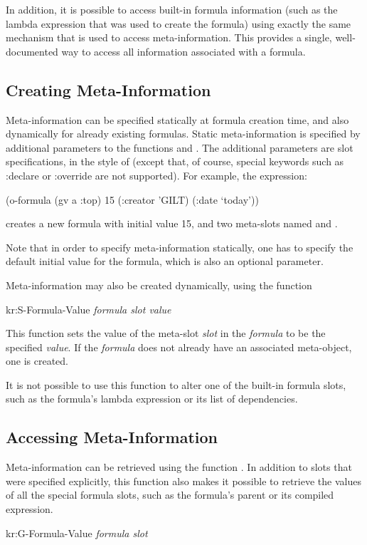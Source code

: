 In addition, it is possible to access built-in formula information
(such as the lambda expression that was used to create the formula)
using exactly the same mechanism that is used to access
meta-information.  This provides a single, well-documented way to
access all information associated with a formula.

\subsection{Creating Meta-Information}

Meta-information can be specified statically at formula creation time,
and also dynamically for already existing formulas.  Static
meta-information is specified by additional parameters to the
functions  and .  The additional parameters
are slot specifications, in the style of  (except
that, of course, special  keywords such as
{\sc :declare} or {\sc :override} are not supported).  For example, the
expression:
\begin{programexample}
 (o-formula (gv a :top) 15
   (:creator 'GILT) (:date `today'))
\end{programexample}
creates a new formula with initial value 15, and two meta-slots named
 and .

Note that in order to specify meta-information statically, one has to
specify the default initial value for the formula, which is also an
optional parameter.

Meta-information may also be created dynamically, using the function
\begin{example}
kr:S-Formula-Value {\it formula slot value}		\value{function}
\end{example}

This function sets the value of the meta-slot {\it slot} in the
{\it formula} to be the specified {\it value}.  If the {\it formula} does
not already have an associated meta-object, one is created.

It is not possible to use this function to alter one of the built-in
formula slots, such as the formula's lambda expression or its list of
dependencies.


\begin{group}
\subsection{Accessing Meta-Information}

Meta-information can be retrieved using the function
.  In addition to slots that were specified
explicitly, this function also makes it possible to retrieve the
values of all the special formula slots, such as the formula's parent
or its compiled expression.
\begin{example}
kr:G-Formula-Value {\it formula slot}		\value{function}
\end{example}
\end{group}

